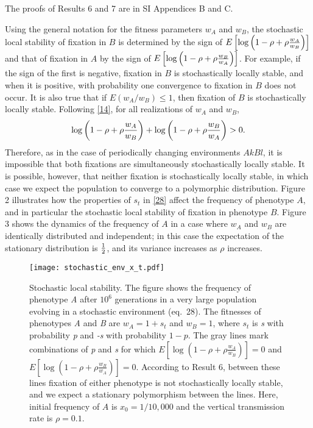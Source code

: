 \documentclass[9pt,twocolumn,twoside,lineno]{pnas-new}
\begin{document}
 The proofs of Results 6 and 7 are in SI Appendices B and C.
 
 
 Using the general notation for the fitness parameters $w_A$ and $w_B$, the stochastic local stability of fixation in $B$ is determined by the sign of $E\left[\log\left(1-\rho+\rho{w_A\over w_B}\right)\right]$ and that of fixation in $A$  by the sign of $E\left[\log\left(1-\rho+\rho{w_B\over w_A}\right)\right]$. For example, if the  sign of the first  is negative, fixation in $B$ is stochastically locally stable, and when it is positive, with probability one convergence to fixation in  $B$ does not occur. It is also true  that if $E(w_A/w_B)\le 1$, then fixation of $B$ is stochastically locally stable. Following \eqref{14}, for all realizations of $w_A$ and $w_B$,
 \begin{equation}
 \log\left(1-\rho +\rho{w_A\over w_B}\right) +\log\left(1-\rho +\rho{w_B\over w_A}\right)>0.\label{30}\end{equation}
 Therefore, as in the case of periodically changing environments $AkBl$, it is impossible that both fixations are simultaneously stochastically locally stable.  It is possible, however, that neither fixation is  stochastically locally stable, in which case we expect the population to converge to a polymorphic distribution. Figure 2 illustrates how the properties of $s_t$ in \eqref{28} affect the frequency of phenotype $A$, and in particular the stochastic local stability of fixation in phenotype $B$. Figure 3 shows the dynamics of the frequency of $A$ in a case where $w_A$ and $w_B$ are identically distributed and independent; in this case the expectation of the stationary distribution is ${1\over 2}$, and its variance increases as $\rho$ increases.

\begin{figure}[h]
\centering
\texttt{[image: stochastic\_env\_x\_t.pdf]}
\caption{Stochastic local stability. 
The figure shows the frequency of phenotype \emph{A} after \(10^6\) generations in a very large population evolving in a stochastic environment (eq.\ 28).
The fitnesses of phenotypes \emph{A} and \emph{B} are \(w_A=1+s_t\) and \(w_B=1\),
where \(s_t\) is \emph{s} with probability \emph{p} and \emph{-s} with probability \(1-p\).
The gray lines mark combinations of \emph{p} and \emph{s} for which \(E[\log{(1-\rho+\rho\frac{w_A}{w_B})}]=0\) and \(E[\log{(1-\rho+\rho\frac{w_B}{w_A})}]=0\).
According to Result 6, between these lines fixation of either phenotype is not stochastically locally stable, and we expect a stationary polymorphism between the lines.
Here, initial frequency of \(A\) is \(x_0=1/10,000\) and the vertical transmission rate is \(\rho=0.1\).}\label{fig:stochastic_env_x_t}
\end{figure} 
\end{document}
